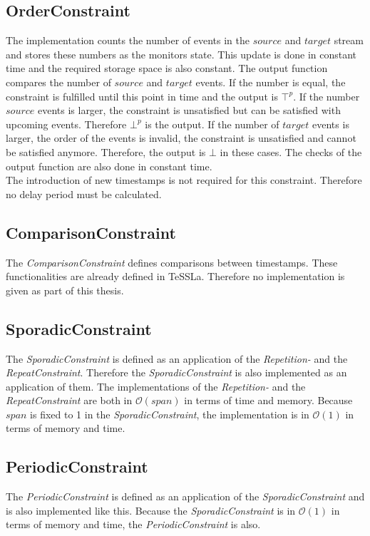 \subsection{OrderConstraint}
	The implementation counts the number of events in the $source$ and $target$ stream and stores these numbers as the monitors state. This update is done in constant time and the required storage space is also constant. The output function compares the number of $source$ and $target$ events. If the number is equal, the constraint is fulfilled until this point in time and the output is $\top^p$. If the number $source$ events is larger, the constraint is unsatisfied but can be satisfied with upcoming events. Therefore $\bot^p$ is the output. If the number of $target$ events is larger, the order of the events is invalid, the constraint is unsatisfied and cannot be satisfied anymore. Therefore, the output is $\bot$ in these cases. The checks of the output function are also done in constant time.\\
	The introduction of new timestamps is not required for this constraint. Therefore no delay period must be calculated.
	
\subsection{ComparisonConstraint}
	The \emph{ComparisonConstraint} defines comparisons between timestamps. These functionalities are already defined in TeSSLa. Therefore no implementation is given as part of this thesis.  
	
\subsection{SporadicConstraint}
	The \emph{SporadicConstraint} is defined as an application of the \emph{Repetition-} and the \emph{RepeatConstraint}. Therefore the \emph{SporadicConstraint} is also implemented as an application of them. The implementations of the \emph{Repetition-} and the \emph{RepeatConstraint} are both in $\mathcal{O}(span)$ in terms of time and memory. Because $span$ is fixed to 1 in the \textit{SporadicConstraint}, the implementation is in $\mathcal{O}(1)$ in terms of memory and time.
	
\subsection{PeriodicConstraint}
	The \emph{PeriodicConstraint} is defined as an application of the \emph{SporadicConstraint} and is also implemented like this. Because the \emph{SporadicConstraint} is in $\mathcal{O}(1)$ in terms of memory and time, the \emph{PeriodicConstraint} is also.
	
